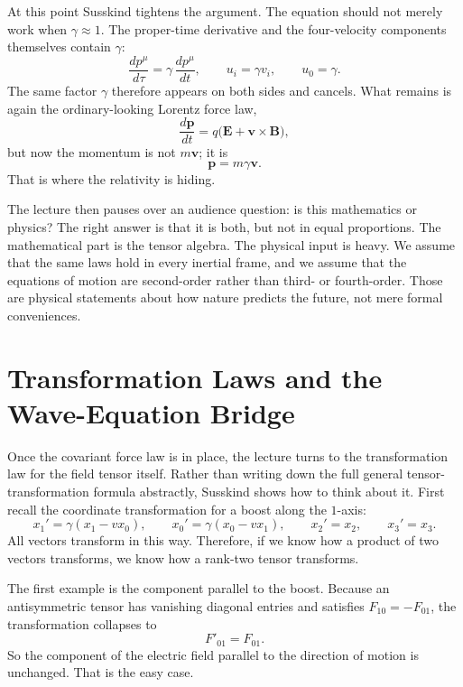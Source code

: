 At this point Susskind tightens the argument. The equation should not merely work when \(\gamma\approx 1\). The proper-time derivative and the four-velocity components themselves contain \(\gamma\):
\begin{equation}
\frac{dp^\mu}{d\tau}
=
\gamma\,\frac{dp^\mu}{dt},
\qquad
u_i=\gamma v_i,
\qquad
u_0=\gamma.
\end{equation}
The same factor \(\gamma\) therefore appears on both sides and cancels. What remains is again the ordinary-looking Lorentz force law,
\begin{equation}
\frac{d\mathbf p}{dt}
=
q\bigl(\mathbf E+\mathbf v\times\mathbf B\bigr),
\end{equation}
but now the momentum is not \(m\mathbf v\); it is
\begin{equation}
\mathbf p = m\gamma \mathbf v.
\end{equation}
That is where the relativity is hiding.

The lecture then pauses over an audience question: is this mathematics or physics? The right answer is that it is both, but not in equal proportions. The mathematical part is the tensor algebra. The physical input is heavy. We assume that the same laws hold in every inertial frame, and we assume that the equations of motion are second-order rather than third- or fourth-order. Those are physical statements about how nature predicts the future, not mere formal conveniences.

\section{Transformation Laws and the Wave-Equation Bridge}

Once the covariant force law is in place, the lecture turns to the transformation law for the field tensor itself. Rather than writing down the full general tensor-transformation formula abstractly, Susskind shows how to think about it. First recall the coordinate transformation for a boost along the \(1\)-axis:
\begin{equation}
x_1'=\gamma(x_1-vx_0),
\qquad
x_0'=\gamma(x_0-vx_1),
\qquad
x_2'=x_2,
\qquad
x_3'=x_3.
\end{equation}
All vectors transform in this way. Therefore, if we know how a product of two vectors transforms, we know how a rank-two tensor transforms.

The first example is the component parallel to the boost. Because an antisymmetric tensor has vanishing diagonal entries and satisfies \(F_{10}=-F_{01}\), the transformation collapses to
\begin{equation}
F'_{01}=F_{01}.
\end{equation}
So the component of the electric field parallel to the direction of motion is unchanged. That is the easy case.

